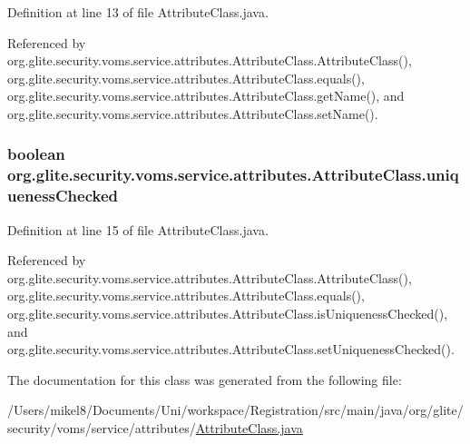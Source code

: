 Definition at line 13 of file AttributeClass.java.



Referenced by org.glite.security.voms.service.attributes.AttributeClass.AttributeClass(), org.glite.security.voms.service.attributes.AttributeClass.equals(), org.glite.security.voms.service.attributes.AttributeClass.getName(), and org.glite.security.voms.service.attributes.AttributeClass.setName().

\hypertarget{classorg_1_1glite_1_1security_1_1voms_1_1service_1_1attributes_1_1AttributeClass_a042045180f498b121edf4387254a6485}{
\subsubsection[{uniquenessChecked}]{\setlength{\rightskip}{0pt plus 5cm}boolean {\bf org.glite.security.voms.service.attributes.AttributeClass.uniquenessChecked}}}
\label{classorg_1_1glite_1_1security_1_1voms_1_1service_1_1attributes_1_1AttributeClass_a042045180f498b121edf4387254a6485}


Definition at line 15 of file AttributeClass.java.



Referenced by org.glite.security.voms.service.attributes.AttributeClass.AttributeClass(), org.glite.security.voms.service.attributes.AttributeClass.equals(), org.glite.security.voms.service.attributes.AttributeClass.isUniquenessChecked(), and org.glite.security.voms.service.attributes.AttributeClass.setUniquenessChecked().



The documentation for this class was generated from the following file:\begin{DoxyCompactItemize}
\item 
/Users/mikel8/Documents/Uni/workspace/Registration/src/main/java/org/glite/security/voms/service/attributes/\hyperlink{AttributeClass_8java}{AttributeClass.java}\end{DoxyCompactItemize}
